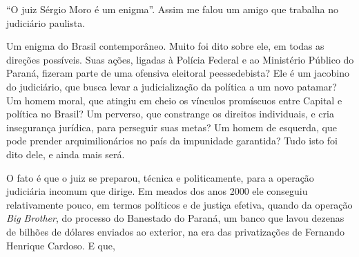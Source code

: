 ``O juiz Sérgio Moro é um enigma''. Assim me falou um amigo que trabalha
no judiciário paulista.

Um enigma do Brasil contemporâneo. Muito foi dito sobre ele, em todas as
direções possíveis. Suas ações, ligadas à Polícia Federal e ao
Ministério Público do Paraná, fizeram parte de uma ofensiva eleitoral
peessedebista? Ele é um jacobino do judiciário, que busca levar a
judicialização da política a um novo patamar? Um homem moral, que
atingiu em cheio os vínculos promíscuos entre Capital e política no
Brasil? Um perverso, que constrange os direitos individuais, e cria
insegurança jurídica, para perseguir suas metas? Um homem de esquerda,
que pode prender arquimilionários no país da impunidade garantida? Tudo
isto foi dito dele, e ainda mais será.

O fato é que o juiz se preparou, técnica e politicamente, para a
operação judiciária incomum que dirige. Em meados dos anos 2000 ele
conseguiu relativamente pouco, em termos políticos e de justiça efetiva,
quando da operação \emph{Big Brother}, do processo do Banestado do
Paraná, um banco que lavou dezenas de bilhões de dólares enviados ao
exterior, na era das privatizações de Fernando Henrique Cardoso. E que,
